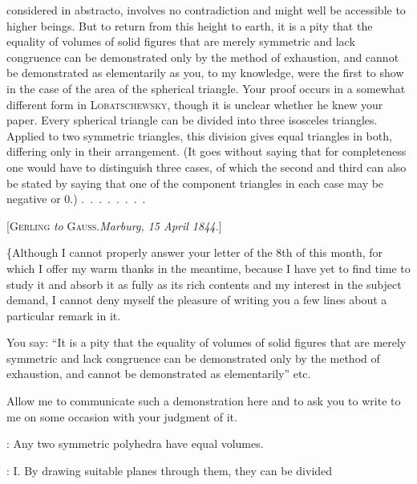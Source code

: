 %
\noindent considered in abstracto, involves no contradiction and might well be accessible to higher beings. But to return from this height to earth, it is a pity that the equality of volumes of solid figures that are merely symmetric and lack congruence can be demonstrated only by the method of exhaustion, and cannot be demonstrated as elementarily as you, to my knowledge, were the first to show in the case of the area of the spherical triangle. Your proof occurs in a somewhat different form in \textsc{Lobatschewsky}, though it is unclear whether he knew your paper. Every spherical triangle can be divided into three isosceles triangles. Applied to two symmetric triangles, this division gives equal triangles in both, differing only in their arrangement. (It goes without saying that for completeness one would have to distinguish three cases, of which the second and third can also be stated by saying that one of the component triangles in each case may be negative or 0.)
\mbox{.\ .\ .\ .\ .\ .\ .\ .}

\par\bigskip

\begin{center}
[\textsc{Gerling} \emph{to} \textsc{Gauss}.\quad \emph{Marburg, 15 April 1844.}]
\end{center}

\{Although I cannot properly answer your letter of the 8th of this month, for which I offer my warm thanks in the meantime, because I have yet to find time to study it and absorb it as fully as its rich contents and my interest in the subject demand, I cannot deny myself the pleasure of writing you a few lines about a particular remark in it.

You say: “It is a pity that the equality of volumes of solid figures that are merely symmetric and lack congruence can be demonstrated only by the method of exhaustion, and cannot be demonstrated as elementarily”
etc.

Allow me to communicate such a demonstration here and to ask you to write to me on some occasion with your judgment of it.

: Any two symmetric polyhedra have equal volumes.

: I. By drawing suitable planes through them, they can be divided\space%
